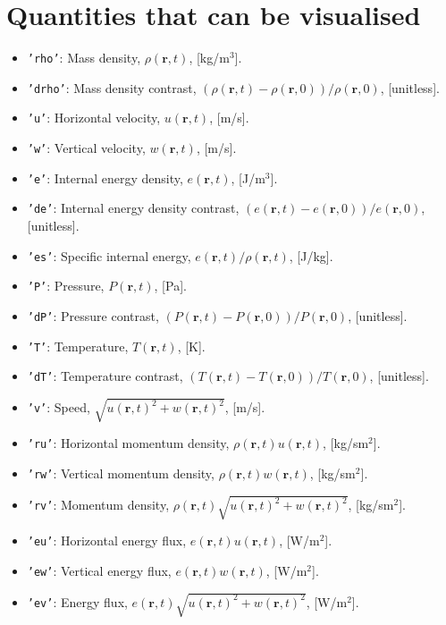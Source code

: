 \documentclass{article}
\newcommand{\ttt}[1]{\texttt{#1}}
\newcommand{\cyo}[1]{\textcolor{YellowOrange}{#1}}
\begin{document}
\section{Quantities that can be visualised}
\label{sec:quants}
\begin{itemize}
	\item \ttt{\cyo{'rho'}}: Mass density, $\rho(\mathbf{r}, t)$, [kg/m$^3$].
	\item \ttt{\cyo{'drho'}}: Mass density contrast, $(\rho(\mathbf{r}, t) - \rho(\mathbf{r}, 0))/\rho(\mathbf{r}, 0)$, [unitless].
	\item \ttt{\cyo{'u'}}: Horizontal velocity, $u(\mathbf{r}, t)$, [m/s].
	\item \ttt{\cyo{'w'}}: Vertical velocity, $w(\mathbf{r}, t)$, [m/s].
	\item \ttt{\cyo{'e'}}: Internal energy density, $e(\mathbf{r}, t)$, [J/m$^3$].
	\item \ttt{\cyo{'de'}}: Internal energy density contrast, $(e(\mathbf{r}, t) - e(\mathbf{r}, 0))/e(\mathbf{r}, 0)$, [unitless].
	\item \ttt{\cyo{'es'}}: Specific internal energy, $e(\mathbf{r}, t)/\rho(\mathbf{r}, t)$, [J/kg].
	\item \ttt{\cyo{'P'}}: Pressure, $P(\mathbf{r}, t)$, [Pa].
	\item \ttt{\cyo{'dP'}}: Pressure contrast, $(P(\mathbf{r}, t) - P(\mathbf{r}, 0))/P(\mathbf{r}, 0)$, [unitless].
	\item \ttt{\cyo{'T'}}: Temperature, $T(\mathbf{r}, t)$, [K].
	\item \ttt{\cyo{'dT'}}: Temperature contrast, $(T(\mathbf{r}, t) - T(\mathbf{r}, 0))/T(\mathbf{r}, 0)$, [unitless].
	\item \ttt{\cyo{'v'}}: Speed, $\sqrt{u(\mathbf{r}, t)^2 + w(\mathbf{r}, t)^2}$, [m/s].
	\item \ttt{\cyo{'ru'}}: Horizontal momentum density, $\rho(\mathbf{r}, t)u(\mathbf{r}, t)$, [kg/sm$^2$].
	\item \ttt{\cyo{'rw'}}: Vertical momentum density, $\rho(\mathbf{r}, t)w(\mathbf{r}, t)$, [kg/sm$^2$].
	\item \ttt{\cyo{'rv'}}: Momentum density, $\rho(\mathbf{r}, t)\sqrt{u(\mathbf{r}, t)^2 + w(\mathbf{r}, t)^2}$, [kg/sm$^2$].
	\item \ttt{\cyo{'eu'}}: Horizontal energy flux, $e(\mathbf{r}, t)u(\mathbf{r}, t)$, [W/m$^2$].
	\item \ttt{\cyo{'ew'}}: Vertical energy flux, $e(\mathbf{r}, t)w(\mathbf{r}, t)$, [W/m$^2$].
	\item \ttt{\cyo{'ev'}}: Energy flux, $e(\mathbf{r}, t)\sqrt{u(\mathbf{r}, t)^2 + w(\mathbf{r}, t)^2}$, [W/m$^2$].
\end{itemize}
\end{document}
